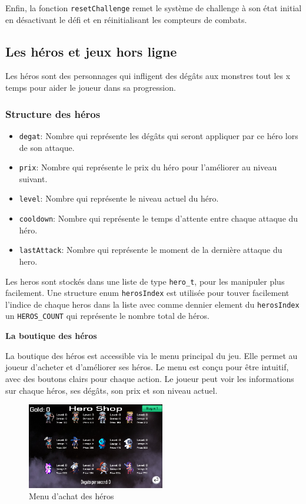 \documentclass[11pt,a4paper]{article}
\begin{document}
Enfin, la fonction \texttt{resetChallenge} remet le système de challenge à son état initial en désactivant le défi et en réinitialisant les compteurs de combats.

\subsection {Les héros et jeux hors ligne}
Les héros sont des personnages qui infligent des dégâts 
aux monstres tout les x temps pour aider le joueur dans sa progression.

\subsubsection{Structure des héros}

\begin{itemize}
    \item \texttt{degat}: Nombre qui représente les dégâts qui seront appliquer par ce héro lors de son attaque.
    \item \texttt{prix}: Nombre qui représente le prix du héro pour l'améliorer au niveau suivant.
    \item \texttt{level}: Nombre qui représente le niveau actuel du héro.
    \item \texttt{cooldown}: Nombre qui représente le temps d'attente entre chaque attaque du héro.
    \item \texttt{lastAttack}: Nombre qui représente le moment de la dernière attaque du hero.
\end{itemize}

Les heros sont stockés dans une liste de type \texttt{hero_t}, pour les manipuler plus facilement. Une structure enum \texttt{herosIndex} est 
utilisée pour touver facilement l'indice de chaque heros dans la liste avec comme dennier element du \texttt{herosIndex} 
un \texttt{HEROS\_COUNT} qui représente le nombre total de héros.

\textbf{La boutique des héros}

La boutique des héros est accessible via le menu principal du jeu. Elle permet au joueur d'acheter et d'améliorer ses héros. 
Le menu est conçu pour être intuitif, avec des boutons clairs pour chaque action. Le joueur peut voir les informations sur chaque héros, 
ses dégâts, son prix et son niveau actuel.
\begin{figure}[h] 
    \centering 
    \includegraphics[width=6cm]{img/MenuHeros.png} 
    \caption{Menu d'achat des héros}
\end{figure}
\end{document}
